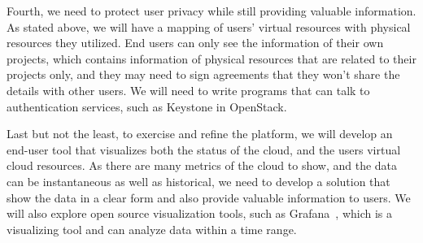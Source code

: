 Fourth, we need to protect user privacy while still providing valuable information. As stated above, we will have a mapping of users’ virtual resources with physical resources they utilized. End users can only see the information of their own projects, which contains information of physical resources that are related to their projects only, and they may need to sign agreements that they won’t share the details with other users. We will need to write programs that can talk to authentication services, such as Keystone in OpenStack. 

Last but not the least, to exercise and refine the platform, we will develop an end-user tool that visualizes both the status of the cloud, and the users virtual cloud resources. As there are many metrics of the cloud to show, and the data can be instantaneous as well as historical, we need to develop a solution that show the data in a clear form and also provide valuable information to users. We will also explore open source visualization tools, such as Grafana~\cite{grafana}, which is a  visualizing tool and can analyze data within a time range.  



